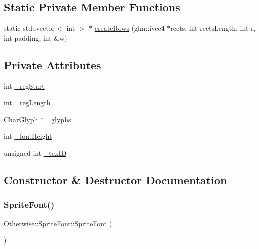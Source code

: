 \subsection*{Static Private Member Functions}
\begin{DoxyCompactItemize}
\item 
static std\+::vector$<$ int $>$ $\ast$ \hyperlink{class_otherwise_1_1_sprite_font_a46d4525f7e2cbcd762b00b32885f60a1}{create\+Rows} (glm\+::ivec4 $\ast$rects, int rects\+Length, int r, int padding, int \&w)
\end{DoxyCompactItemize}
\subsection*{Private Attributes}
\begin{DoxyCompactItemize}
\item 
int \hyperlink{class_otherwise_1_1_sprite_font_a87e10732d951b4909d976aad334534c2}{\+\_\+reg\+Start}
\item 
int \hyperlink{class_otherwise_1_1_sprite_font_a11affde05ba5615112c873b9ec182aee}{\+\_\+reg\+Length}
\item 
\hyperlink{struct_otherwise_1_1_char_glyph}{Char\+Glyph} $\ast$ \hyperlink{class_otherwise_1_1_sprite_font_ac20e86fa13894a4833831d2aa6490f19}{\+\_\+glyphs}
\item 
int \hyperlink{class_otherwise_1_1_sprite_font_a7f7ad0911b50f50123c0d713d4047711}{\+\_\+font\+Height}
\item 
unsigned int \hyperlink{class_otherwise_1_1_sprite_font_a17c16cdf59495a7082e68a81993999ac}{\+\_\+tex\+ID}
\end{DoxyCompactItemize}


\subsection{Constructor \& Destructor Documentation}
\mbox{\label{class_otherwise_1_1_sprite_font_aef9bd7e1b5bb753be2124109865e4444}} 
\subsubsection{\texorpdfstring{Sprite\+Font()}{SpriteFont()}\hspace{0.1cm}{\footnotesize\ttfamily [1/3]}}
{\footnotesize\ttfamily Otherwise\+::\+Sprite\+Font\+::\+Sprite\+Font (\begin{DoxyParamCaption}{ }\end{DoxyParamCaption})\hspace{0.3cm}{\ttfamily [inline]}}

